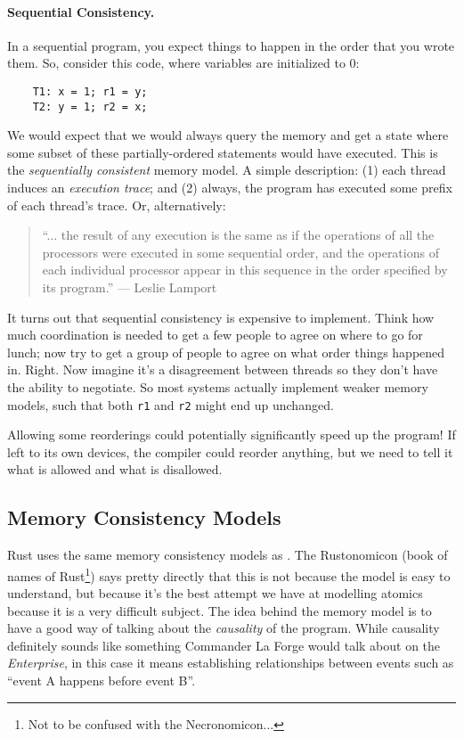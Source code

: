 \paragraph{Sequential Consistency.} In a sequential program, you expect
things to happen in the order that you wrote them. So, consider this code,
where variables are initialized to 0:

\begin{center}
\begin{lstlisting}
    T1: x = 1; r1 = y;
    T2: y = 1; r2 = x;
\end{lstlisting}
\end{center}
We would expect that we would always query the memory and get a state
where some subset of these partially-ordered statements would have executed.
This is the \emph{sequentially consistent} memory model. A simple description: (1) each thread induces an \emph{execution trace}; and (2) always, the program has executed some prefix of each thread's trace. Or, alternatively:

\begin{quote}
``... the result of any execution is the same as if the operations of all the processors were executed in some sequential order, and the operations of each individual processor appear in this sequence in the order specified by its program.'' --- Leslie Lamport
\end{quote}


It turns out that sequential consistency is expensive to implement.
Think how much coordination is needed to get a few people to agree on where to go for lunch; now try to get a group of people to agree on what order things happened in. Right. Now imagine it's a disagreement between threads so they don't have the ability to negotiate. So most systems actually implement weaker memory models, such that both {\tt r1} and {\tt r2} might end up unchanged.

Allowing some reorderings could potentially significantly speed up the program! If left to its own devices, the compiler could reorder anything, but we need to tell it what is allowed and what is disallowed. 

\subsection*{Memory Consistency Models}

Rust uses the same memory consistency models as \CPP. The Rustonomicon (book of names of Rust\footnote{Not to be confused with the Necronomicon...}) says pretty directly that this is not because the model is easy to understand, but because it's the best attempt we have at modelling atomics because it is a very difficult subject. The idea behind the memory model is to have a good way of talking about the \textit{causality} of the program. While causality definitely sounds like something Commander La Forge would talk about on the \textit{Enterprise}, in this case it means establishing relationships between events such as ``event A happens before event B''. 


